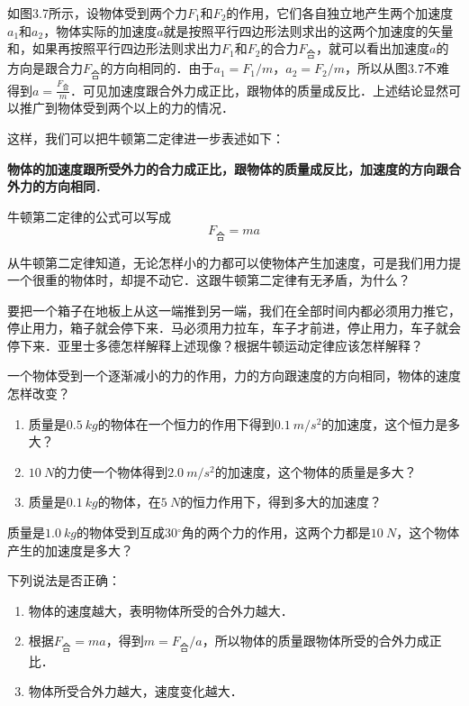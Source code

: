 \begin{Test}
如图3.7所示，设物体受到两个力$F_1$和$F_2$的作用，它们各自独立地产生两个加速度$a_1$和$a_2$，物体实际的加速度$a$就是按照平行四边形法则求出的这两个加速度的矢量和，如果再按照平行四边形法则求出力$F_1$和$F_2$的合力$F_{\text{合}}$，就可以看出加速度$a$的方向是跟合力$F_{\text{合}}$的方向相同的．由于$a_1=F_1/m$，$a_2=F_2/m$，所以从图3.7不难得到$a=\frac{F_{\text{合}}}{m}$．可见加速度跟合外力成正比，跟物体的质量成反比．上述结论显然可以推广到物体受到两个以上的力的情况．

这样，我们可以把牛顿第二定律进一步表述如下：

\textbf{ 物体的加速度跟所受外力的合力成正比，跟物体的质量成反比，加速度的方向跟合外力的方向相同}．

牛顿第二定律的公式可以写成
\begin{equation}
    F_{\text{合}}=ma
\end{equation}





\begin{Exercise}
	\begin{QsNum}
		\item 从牛顿第二定律知道，无论怎样小的力都可以使物体产生加速度，可是我们用力提一个很重的物体时，却提不动它．这跟牛顿第二定律有无矛盾，为什么？
		\item 要把一个箱子在地板上从这一端推到另一端，我们在全部时间内都必须用力推它，停止用力，箱子就会停下来．马必须用力拉车，车子才前进，停止用力，车子就会停下来．亚里士多德怎样解释上述现像？根据牛顿运动定律应该怎样解释？
		\item 一个物体受到一个逐渐减小的力的作用，力的方向跟速度的方向相同，物体的速度怎样改变？
		\item \begin{enumerate}
			\item  质量是$\SI{0.5}{kg}$的物体在一个恒力的作用下得到$\SI{0.1}{m/s^2}$的加速度，这个恒力是多大？
			\item $\SI{10}{N}$的力使一个物体得到$\SI{2.0}{m/s^2}$的加速度，这个物体的质量是多大？
			\item 质量是$\SI{0.1}{kg}$的物体，在$\SI{5}{N}$的恒力作用下，得到多大的加速度？
		\end{enumerate}
		\item 质量是$\SI{1.0}{kg}$的物体受到互成30$^\circ$角的两个力的作用，这两个力都是$\SI{10}{N}$，这个物体产生的加速度是多大？
		\item 下列说法是否正确：
		\begin{enumerate}
			\item 物体的速度越大，表明物体所受的合外力越大．
			\item 根据$F_{\text{合}}=ma$，得到$m=F_{\text{合}}/a$，所以物体的质量跟物体所受的合外力成正比．
			\item 物体所受合外力越大，速度变化越大．
		\end{enumerate}
	\end{QsNum}
\end{Exercise}





\end{Test}
